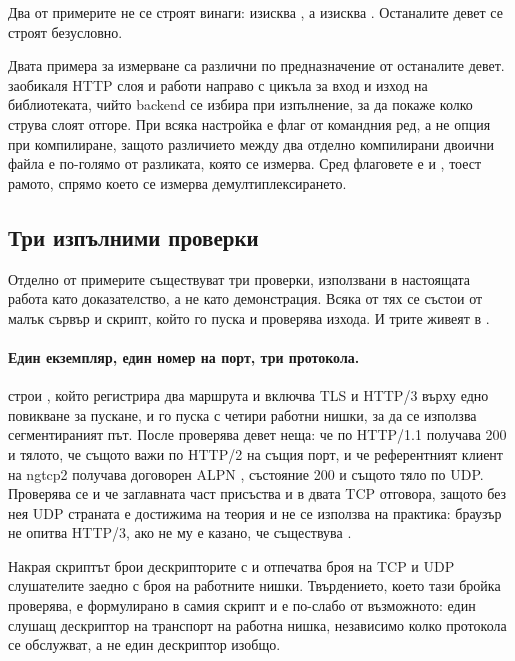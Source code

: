 Два от примерите не се строят винаги:  изисква
, а  изисква .
Останалите девет се строят безусловно.

Двата примера за измерване са различни по предназначение от останалите девет.
 заобикаля HTTP слоя и работи направо с цикъла за вход и изход на
библиотеката, чийто backend се избира при изпълнение, за да покаже колко струва слоят отгоре. При  всяка настройка е
флаг от командния ред, а не опция при компилиране, защото различието между два отделно
компилирани двоични файла е по-голямо от разликата, която се измерва. Сред флаговете е и
, тоест рамото, спрямо което се измерва демултиплексирането.

\subsection{Три изпълними проверки}
\label{ssec:app-checks}

Отделно от примерите съществуват три проверки, използвани в настоящата работа като
доказателство, а не като демонстрация. Всяка от тях се състои от малък сървър и скрипт,
който го пуска и проверява изхода. И трите живеят в .

\paragraph{Един екземпляр, един номер на порт, три протокола.}
 строи , който регистрира два маршрута
и включва TLS и HTTP/3 върху едно повикване за пускане, и го пуска с четири работни нишки,
за да се използва сегментираният път. После проверява девет неща: че  по HTTP/1.1
получава 200 и тялото, че същото важи по HTTP/2 на същия порт, и че референтният клиент на
ngtcp2 получава договорен ALPN , състояние 200 и същото тяло по UDP. Проверява се
и че заглавната част  присъства и в двата TCP отговора, защото без нея UDP
страната е достижима на теория и не се използва на практика: браузър не опитва HTTP/3, ако
не му е казано, че съществува \cite{rfc7838}.

Накрая скриптът брои дескрипторите с  и отпечатва броя на TCP и UDP слушателите
заедно с броя на работните нишки. Твърдението, което тази бройка проверява, е формулирано в
самия скрипт и е по-слабо от възможното: един слушащ дескриптор на транспорт на работна
нишка, независимо колко протокола се обслужват, а не един дескриптор изобщо.

